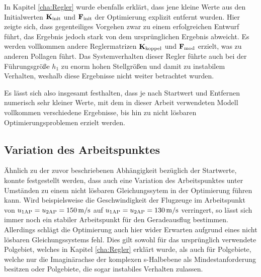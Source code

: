 In Kapitel \ref{cha:Regler} wurde ebenfalls erklärt, dass jene kleine Werte aus den Initialwerten ${\boldsymbol{\mathrm{K}}}_{\textnormal{init}}$ und ${\boldsymbol{\mathrm{F}}}_{\textnormal{init}}$ der Optimierung explizit entfernt wurden. Hier zeigte sich, dass gegenteiliges Vorgehen zwar zu einem erfolgreichen Entwurf führt, das Ergebnis jedoch stark von dem ursprünglichen Ergebnis abweicht. Es werden vollkommen andere Reglermatrizen ${\boldsymbol{\mathrm{K}}}_{\textnormal{koppel}}$ und ${\boldsymbol{\mathrm{F}}}_{\textnormal{mod}}$ erzielt, was zu anderen Pollagen führt. Das Systemverhalten dieser Regler führte auch bei der Führungsgröße $h_1$ zu enorm hohen Stellgrößen und damit zu instabilem Verhalten, weshalb diese Ergebnisse nicht weiter betrachtet wurden. 

Es lässt sich also insgesamt festhalten, dass je nach Startwert und Entfernen numerisch sehr kleiner Werte, mit dem in dieser Arbeit verwendeten Modell vollkommen verschiedene Ergebnisse, bis hin zu nicht lösbaren Optimierungsproblemen erzielt werden. 

\subsection{Variation des Arbeitspunktes}
Ähnlich zu der zuvor beschriebenen Abhängigkeit bezüglich der Startwerte, konnte festgestellt werden, dass auch eine Variation des Arbeitspunktes unter Umständen zu einem nicht lösbaren Gleichungssytem in der Optimierung führen kann. Wird beispielsweise die Geschwindigkeit der Flugzeuge im Arbeitspunkt von $u_{1\textnormal{AP}} = u_{2\textnormal{AP}} = 150\,\mathrm{m/s}$ auf $u_{1\textnormal{AP}} = u_{2\textnormal{AP}} = 130\,\mathrm{m/s}$ verringert, so lässt sich immer noch ein stabiler Arbeitspunkt für den Geradeausflug bestimmen. Allerdings schlägt die Optimierung auch hier wider Erwarten aufgrund eines nicht lösbaren Gleichungssystems fehl. Dies gilt sowohl für das ursprünglich verwendete Polgebiet, welches in Kapitel \ref{cha:Regler} erklärt wurde, als auch für Polgebiete, welche nur die Imaginärachse der komplexen s-Halbebene als Mindestanforderung besitzen oder Polgebiete, die sogar instabiles Verhalten zulassen.

